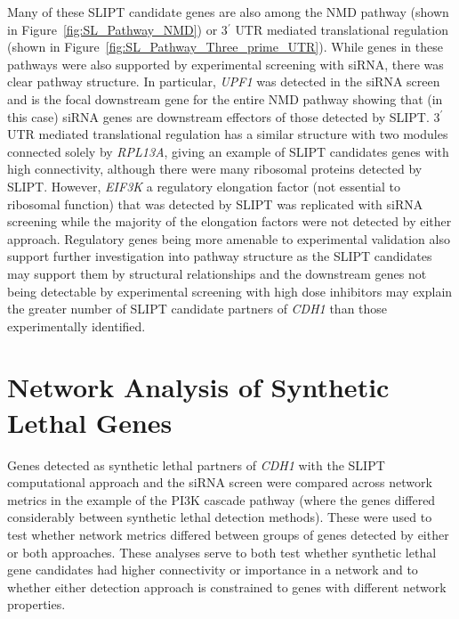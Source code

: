 Many of these \gls{SLIPT} candidate genes are also among the \gls{NMD} pathway (shown in Figure~\ref{fig:SL_Pathway_NMD}) or 3$^\prime$ \gls{UTR} mediated translational regulation (shown in Figure~\ref{fig:SL_Pathway_Three_prime_UTR}). While genes in these pathways were also supported by experimental screening with \gls{siRNA}, there was clear pathway structure. In particular, \textit{UPF1} was detected in the \gls{siRNA} screen and is the focal downstream gene for the entire \gls{NMD} pathway showing that (in this case) \gls{siRNA} genes are downstream effectors of those detected by \gls{SLIPT}.  3$^\prime$ \gls{UTR} mediated translational regulation has a similar structure with two modules connected solely by \textit{RPL13A}, giving an example of \gls{SLIPT} candidates genes with high connectivity, although there were many ribosomal proteins detected by \gls{SLIPT}. However, \textit{EIF3K} a regulatory elongation factor (not essential to ribosomal function) that was detected by \gls{SLIPT} was replicated with \gls{siRNA} screening while the majority of the elongation factors were not detected by either approach. Regulatory genes being more amenable to experimental validation also support further investigation into pathway structure as the \gls{SLIPT} candidates may support them by structural relationships and the downstream genes not being detectable by experimental screening with high dose inhibitors may explain the greater number of \gls{SLIPT} candidate partners of \textit{CDH1} than those experimentally identified.


\FloatBarrier

\section{Network Analysis of Synthetic Lethal Genes}   \label{chapt4:Network_Test}


Genes detected as synthetic lethal partners of \textit{CDH1} with the \gls{SLIPT} computational approach and the \gls{siRNA} screen \citep{Telford2015} were compared across network metrics in the example of the PI3K cascade pathway (where the genes differed considerably between synthetic lethal detection methods). These were used to test whether network metrics differed  between groups of genes detected by either or both approaches. These analyses serve to both test whether synthetic lethal gene candidates had higher connectivity or importance in a network and to whether either detection approach is constrained to genes with different network properties.  

